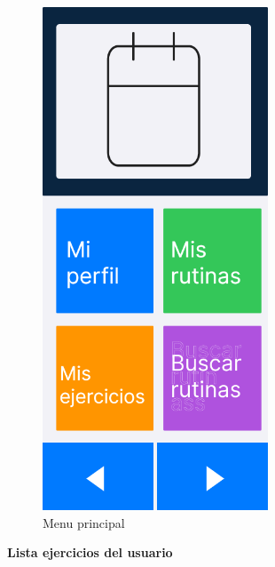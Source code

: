 \begin{figure}[H]
   \centering
    \includegraphics[width=0.6\textwidth]{fotos/Frame 30.png}
    \caption{Menu principal}
    \label{fig:Menu principal}
\end{figure}

\textbf{Lista ejercicios del usuario}

